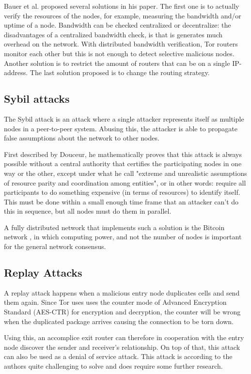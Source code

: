 \documentclass{article}
\begin{document}
		Bauer et al. proposed several solutions in his paper. The first one is to actually verify the resources of the nodes, for example, measuring the bandwidth and/or uptime of a node. Bandwidth can be checked centralized or decentralize: the disadvantages of a centralized bandwidth check, is that is generates much overhead on the network. With distributed bandwidth verification, Tor routers monitor each other but this is not enough to detect selective malicious nodes. Another solution is to restrict the amount of routers that can be on a single IP-address. The last solution proposed is to change the routing strategy.	
		
	\subsection{Sybil attacks}
		The Sybil attack is an attack where a single attacker represents itself as multiple nodes in a peer-to-peer system. Abusing this, the attacker is able to propagate false assumptions about the network to other nodes.
		
		First described by Douceur, he \cite{douceur2002sybil} mathematically proves that this attack is always possible without a central authority that certifies the participating nodes in one way or the other, except under what he call "extreme and unrealistic assumptions of resource parity and coordination among entities", or in other words: require all participants to do something expensive (in terms of resources) to identify itself. This must be done within a small enough time frame that an attacker can't do this in sequence, but all nodes must do them in parallel.
		
		A fully distributed network that implements such a solution is the Bitcoin network \cite{nakamoto2008bitcoin}, in which computing power, and not the number of nodes is important for the general network consensus.
				
	\subsection{Replay Attacks}
		A replay attack \cite{pries2008new} happens when a malicious entry node duplicates cells and send them again. Since Tor uses uses the counter mode of Advanced Encryption Standard (AES-CTR) for encryption and decryption, the counter will be wrong when the duplicated package arrives causing the connection to be torn down.
			
		Using this, an accomplice exit router can therefore in cooperation with the entry node discover the sender and receiver's relationship. On top of that, this attack can also be used as a denial of service attack. This attack is according to the authors quite challenging to solve and does require some further research.
\end{document}

